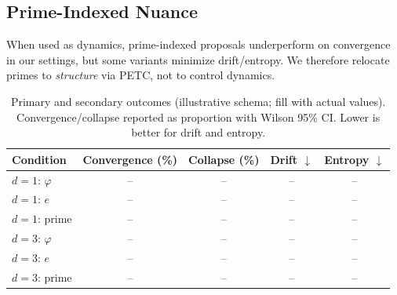 \documentclass[11pt]{article}
\newcommand{\1}{\mathbf{1}}
\newcommand{\phival}{\varphi} %
\newcommand{\PETC}{\textsc{PETC}}
\begin{document}
\subsection{Prime-Indexed Nuance}
When used as dynamics, prime-indexed proposals underperform on convergence in our settings, but some variants minimize drift/entropy. We therefore relocate primes to \emph{structure} via \PETC, not to control dynamics.

\begin{table}[t]
  \centering
  \caption{Primary and secondary outcomes (illustrative schema; fill with actual values). Convergence/collapse reported as proportion with Wilson 95\% CI. Lower is better for drift and entropy.}
  \begin{tabular}{@{}lcccc@{}}
    \toprule
    Condition & Convergence (\%) & Collapse (\%) & Drift $\downarrow$ & Entropy $\downarrow$ \\
    \midrule
    $d=1$: $\phival$ &  -- & -- & -- & -- \\
    $d=1$: $e$        &  -- & -- & -- & -- \\
    $d=1$: prime      &  -- & -- & -- & -- \\
    \midrule
    $d=3$: $\phival$ &  -- & -- & -- & -- \\
    $d=3$: $e$        &  -- & -- & -- & -- \\
    $d=3$: prime      &  -- & -- & -- & -- \\
    \bottomrule
  \end{tabular}
  \label{tab:results}
\end{table}
\end{document}
